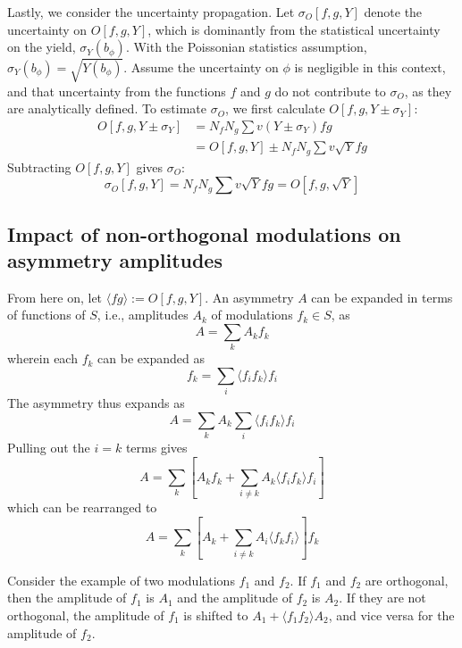 \documentclass[12pt]{article}
\begin{document}
Lastly, we consider the uncertainty propagation. Let $\sigma_O[f,g,Y]$ denote
the uncertainty on $O[f,g,Y]$, which is dominantly from the statistical
uncertainty on the yield, $\sigma_Y(b_\phi)$. With the Poissonian statistics
assumption, $\sigma_Y(b_\phi)=\sqrt{Y(b_\phi)}$. Assume the uncertainty on
$\phi$ is negligible in this context, and that uncertainty from the functions
$f$ and $g$ do not contribute to $\sigma_O$, as they are analytically defined. 
To estimate $\sigma_O$, we first calculate $O\left[f,g,Y\pm\sigma_Y\right]$:
\begin{equation}
\begin{split}
O\left[f,g,Y\pm\sigma_Y\right]
&=N_fN_g\sum{v(Y\pm\sigma_Y)fg}\\
&=O[f,g,Y]\pm N_fN_g\sum{v\sqrt{Y}fg}
\end{split}
\end{equation}
Subtracting $O\left[f,g,Y\right]$ gives $\sigma_O$:
\begin{equation}
\sigma_O[f,g,Y]=N_fN_g\sum{v\sqrt{Y}fg}=O\left[f,g,\sqrt{Y}\right]
\end{equation}


\subsection*{Impact of non-orthogonal modulations on asymmetry amplitudes}
From here on, let $\langle fg\rangle:=O[f,g,Y]$.
An asymmetry $A$ can be expanded in terms of functions of $S$, i.e., amplitudes
$A_k$ of modulations $f_k\in S$, as
\begin{equation}
A=\sum_k{A_kf_k}
\end{equation}
wherein each $f_k$ can be expanded as 
\begin{equation}
f_k=\sum_i{\langle f_if_k\rangle f_i}
\end{equation}
The asymmetry thus expands as
\begin{equation}
A=\sum_k{A_k\sum_i{\langle f_if_k\rangle f_i}}
\end{equation}
Pulling out the $i=k$ terms gives
\begin{equation}
A=\sum_k\left[A_kf_k+\sum_{i\neq k}{A_k\langle f_if_k\rangle f_i}
\right]
\end{equation}
which can be rearranged to
\begin{equation}
A=\sum_k\left[A_k+\sum_{i\neq k}{A_i\langle f_kf_i\rangle}
\right]f_k
\end{equation}

Consider the example of two modulations $f_1$ and $f_2$.
If $f_1$ and $f_2$ are orthogonal, then the amplitude of $f_1$ is $A_1$ and the
amplitude of $f_2$ is $A_2$.  If they are not orthogonal, 
the amplitude of $f_1$ is shifted to $A_1+\langle f_1f_2\rangle A_2$,
and vice versa for the amplitude of $f_2$.
\end{document}
